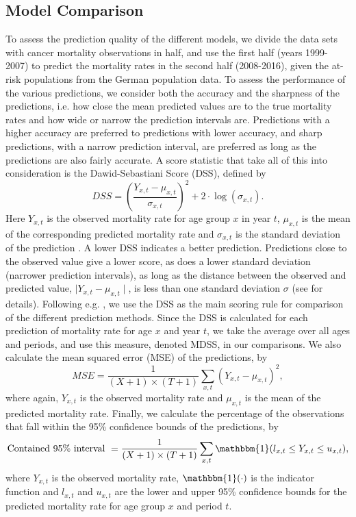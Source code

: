 \subsection{Model Comparison}
\newpar To assess the prediction quality of the different models, we divide the data sets with cancer mortality observations in half, and use the first half (years 1999-2007) to predict the mortality rates in the second half (2008-2016), given the at-risk populations from the German population data. To assess the performance of the various predictions, we consider both the accuracy and the sharpness of the predictions, i.e. how close the mean predicted values are to the true mortality rates and how wide or narrow the prediction intervals are. Predictions with a higher accuracy are preferred to predictions with lower accuracy, and sharp predictions, with a narrow prediction interval, are preferred as long as the predictions are also fairly accurate. A score statistic that take all of this into consideration is the Dawid-Sebastiani Score (DSS), defined by 
\begin{equation}
    DSS = (\frac{Y_{x,t} - \mu_{x,t}}{\sigma_{x,t}})^2 + 2\cdot \log(\sigma_{x,t}).
\end{equation}
Here $Y_{x,t}$ is the observed mortality rate for age group $x$ in year $t$, $\mu_{x,t}$ is the mean of the corresponding predicted mortality rate and $\sigma_{x,t}$ is the standard deviation of the prediction \parencite{Gneiting2007}. A lower DSS indicates a better prediction. Predictions close to the observed value give a lower score, as does a lower standard deviation (narrower prediction intervals), as long as the distance between the observed and predicted value, $\mid Y_{x,t} - \mu_{x,t} \mid$, is less than one standard deviation $\sigma$ (see \textcite{Keilman2020} for details). Following e.g. \textcite{RieblerHeldRue2012}, we use the DSS as the main scoring rule for comparison of the different prediction methods. Since the DSS is calculated for each prediction of mortality rate for age $x$ and year $t$, we take the average over all ages and periods, and use this measure, denoted MDSS, in our comparisons. We also calculate the mean squared error (MSE) of the predictions, by
\begin{equation}
    MSE = \frac{1}{(X + 1)\times(T + 1)}\sum_{x,t} (Y_{x,t} - \mu_{x,t})^2,
\end{equation}
where again, $Y_{x,t}$ is the observed mortality rate and $\mu_{x,t}$ is the mean of the predicted mortality rate. Finally, we calculate the percentage of the observations that fall within the 95\% confidence bounds of the predictions, by
\begin{equation}
    \text{Contained 95\% interval }= \frac{1}{(X + 1)\times(T + 1)}\sum_{x,t}\mathbbm{1}(l_{x,t} \leq Y_{x,t} \leq u_{x,t}),
\end{equation}
where $Y_{x,t}$ is the observed mortality rate, $\mathbbm{1}(\cdot)$ is the indicator function and $l_{x,t}$ and $u_{x,t}$ are the lower and upper 95\% confidence bounds for the predicted mortality rate for age group $x$ and period $t$. 

